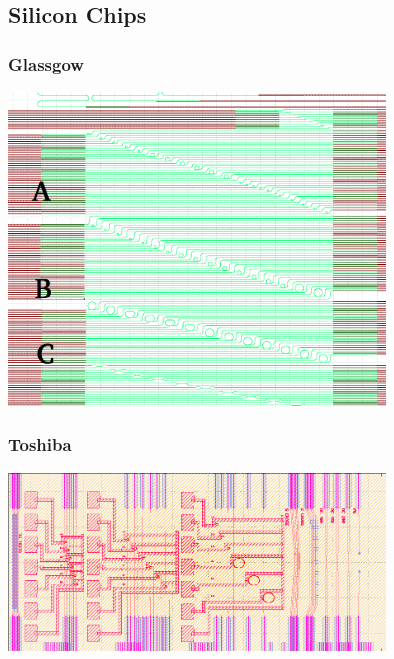 \subsection{Silicon Chips}
\subsubsection{Glassgow}
\begingroup
    \centering  
    \includegraphics[width=10cm]{img/method/glassgowChipNumbering.png}
     \vspace{3pt} \label{crossCompare}
\endgroup
\subsubsection{Toshiba}
\begingroup
    \centering  
    \includegraphics[width=10cm]{img/method/toshiba.png}
     \vspace{3pt} \label{crossCompare}
\endgroup
